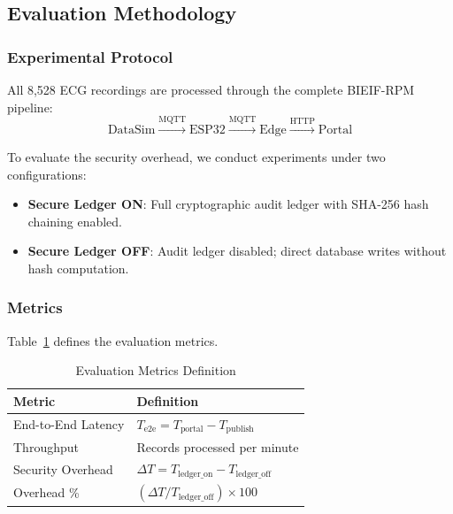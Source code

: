 \documentclass[10pt,twocolumn]{article}
\begin{document}
\subsection{Evaluation Methodology}
\label{subsec:methodology}

\subsubsection{Experimental Protocol}

All 8,528 ECG recordings are processed through the complete BIEIF-RPM pipeline:
\begin{equation}
\text{DataSim} \xrightarrow{\text{MQTT}} \text{ESP32} \xrightarrow{\text{MQTT}} \text{Edge} \xrightarrow{\text{HTTP}} \text{Portal}
\end{equation}

To evaluate the security overhead, we conduct experiments under two configurations:
\begin{itemize}
    \item \textbf{Secure Ledger ON}: Full cryptographic audit ledger with SHA-256 hash chaining enabled.
    \item \textbf{Secure Ledger OFF}: Audit ledger disabled; direct database writes without hash computation.
\end{itemize}

\subsubsection{Metrics}

Table~\ref{tab:metrics_def} defines the evaluation metrics.

\begin{table}[htbp]
\centering
\caption{Evaluation Metrics Definition}
\label{tab:metrics_def}
\footnotesize
\begin{tabular}{@{}p{2.2cm}p{5.3cm}@{}}
\toprule
\textbf{Metric} & \textbf{Definition} \\
\midrule
End-to-End Latency & $T_{\text{e2e}} = T_{\text{portal}} - T_{\text{publish}}$ \\
\addlinespace
Throughput & Records processed per minute \\
\addlinespace
Security Overhead & $\Delta T = T_{\text{ledger\_on}} - T_{\text{ledger\_off}}$ \\
\addlinespace
Overhead \% & $(\Delta T / T_{\text{ledger\_off}}) \times 100$ \\
\bottomrule
\end{tabular}
\end{table}
\end{document}
